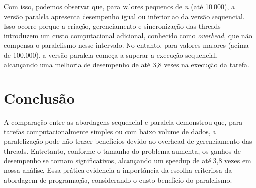 \documentclass[a4paper, 12pt]{article}
\begin{document}
	Com isso, podemos observar que, para valores pequenos de \textit{n} (até 10.000), a versão paralela apresenta desempenho igual ou inferior ao da versão sequencial. Isso ocorre porque a criação, gerenciamento e sincronização das threads introduzem um custo computacional adicional, conhecido como \textit{overhead}, que não compensa o paralelismo nesse intervalo. No entanto, para valores maiores (acima de 100.000), a versão paralela começa a superar a execução sequencial, alcançando uma melhoria de desempenho de até 3,8 vezes na execução da tarefa.
	
	\section{Conclusão}
	\hspace{0.7cm}A comparação entre as abordagens sequencial e paralela demonstrou que, para tarefas computacionalmente simples ou com baixo volume de dados, a paralelização pode não trazer benefícios devido ao overhead de gerenciamento das threads. Entretanto, conforme o tamanho do problema aumenta, os ganhos de desempenho se tornam significativos, alcançando um speedup de até 3,8 vezes em nossa análise. Essa prática evidencia a importância da escolha criteriosa da abordagem de programação, considerando o custo-benefício do paralelismo.
	
	
\end{document}
